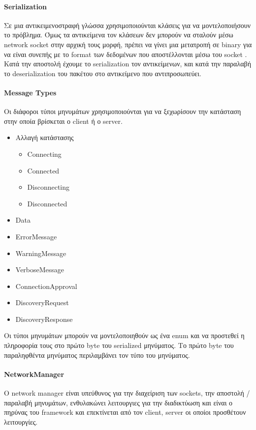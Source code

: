 \documentclass[oneside, 12pt]{book}
\begin{document}
		\paragraph{Serialization}
		Σε μια αντικειμενοστραφή γλώσσα χρησιμοποιούνται κλάσεις για να μοντελοποιήσουν το πρόβλημα. Όμως τα αντικείμενα τον κλάσεων δεν μπορούν να σταλούν μέσω network socket στην αρχική τους μορφή, πρέπει να γίνει μια μετατροπή σε binary για να είναι συνεπής με το format των δεδομένων που αποστέλλονται μέσω του socket . Κατά την αποστολή έχουμε το serialization τον αντικείμενων, και κατά την παραλαβή το deserialization του πακέτου στο αντικείμενο που αντιπροσωπεύει.
		\paragraph{Message Types}
		Οι διάφοροι τύποι μηνυμάτων χρησιμοποιούνται για να ξεχωρίσουν την κατάσταση στην οποία βρίσκεται ο client ή ο server.
			\begin{itemize}
				\item Αλλαγή κατάστασης
				\begin{itemize}
					\item Connecting
					\item Connected
					\item Disconnecting
					\item Disconnected
				\end{itemize}
				\item Data
				\item ErrorMessage
				\item WarningMessage
				\item VerboseMessage
				\item ConnectionApproval
				\item DiscoveryRequest
				\item DiscoveryResponse
			\end{itemize}
		Οι τύποι μηνυμάτων μπορούν να μοντελοποιηθούν ως ένα enum και να προστεθεί η πληροφορία τους στο πρώτο byte του serialized μηνύματος. Το πρώτο byte του παραληφθέντα μηνύματος περιλαμβάνει τον τύπο του μηνύματος.
		
		\paragraph{NetworkManager}
		Ο network manager είναι υπεύθυνος για την διαχείριση των sockets, την αποστολή / παραλαβή μηνυμάτων, ενθυλακώνει λειτουργιες για την διαδικτύωση και είναι ο πηρύνας του framework και επεκτίνεται από τον client, server οι οποίοι προσθέτουν λειτουργίες.
			
\end{document}
